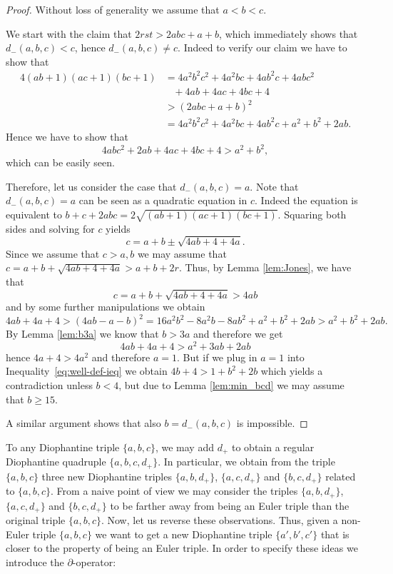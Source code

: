 \documentclass{amsart}
\theoremstyle{definition}
\begin{document}
\begin{proof}
 Without loss of generality we assume that $a<b<c$.

 We start with the claim that $2rst>2abc+a+b$, which immediately shows that $d_{-}(a,b,c)<c$, hence $d_{-}(a,b,c)\neq c$. Indeed to verify our claim we have
 to show that
 \begin{align*}
 4(ab+1)(ac+1)(bc+1)&=4a^2b^2c^2+4a^2bc+4ab^2c+4abc^2\\
 &\;\;\;+4ab+4ac+4bc+4\\
 &>\left(2abc+a+b\right)^2\\
 &=4a^2b^2c^2+4a^2bc+4ab^2c+a^2+b^2+2ab.
 \end{align*}
 Hence we have to show that
 $$4abc^2+2ab+4ac+4bc+4>a^2+b^2,$$
 which can be easily seen.
 
 Therefore, let us consider the case that $d_{-}(a,b,c)=a$. Note that $d_{-}(a,b,c)=a$ 
 can be seen as a quadratic equation in $c$. Indeed the equation is equivalent to $b+c+2abc=2\sqrt{(ab+1)(ac+1)(bc+1)}$.
 Squaring both sides and solving for $c$ yields
 $$c=a+b\pm \sqrt{4ab+4+4a}.$$
 Since we assume that $c>a,b$ we may assume that $c=a+b+ \sqrt{4ab+4+4a}>a+b+2r$. Thus, by Lemma \ref{lem:Jones}, we have that
 $$c=a+b+\sqrt{4ab+4+4a}>4ab$$
 and by some further manipulations we obtain
 \begin{equation}\label{eq:well-def-ieq}
 4ab+4a+4>(4ab-a-b)^2=16a^2b^2-8a^2b-8ab^2+a^2+b^2+2ab>a^2+b^2+2ab.
 \end{equation}
By Lemma \ref{lem:b3a} we know that $b>3a$ and therefore we get
 $$4ab+4a+4>a^2+3ab+2ab$$
 hence $4a+4>4a^2$ and therefore $a=1$. But if we plug in $a=1$ into Inequality~\eqref{eq:well-def-ieq}
 we obtain $4b+4>1+b^2+2b$ which yields a contradiction unless $b<4$, but due to Lemma \ref{lem:min_bcd} we may assume that $b\geq 15$.
 
 A similar argument shows that also $b=d_{-}(a,b,c)$ is impossible.
\end{proof}

To any Diophantine triple $\{a,b,c\}$, we may add $d_{+}$ to obtain a regular Diophantine quadruple $\{a,b,c,d_{+}\}$. In particular,
we obtain from the triple $\{a,b,c\}$ three new Diophantine triples $\{a,b,d_{+}\}$, $\{a,c,d_{+}\}$ and $\{b,c,d_{+}\}$ related to  $\{a,b,c\}$.
From a naive point of view we may consider the triples $\{a,b,d_{+}\}$, $\{a,c,d_{+}\}$ and $\{b,c,d_{+}\}$ to be farther away from being
an Euler triple than the original triple $\{a,b,c\}$. Now, let us reverse these observations. Thus, given a non-Euler triple $\{a,b,c\}$ 
we want to get a new Diophantine triple $\{a',b',c'\}$ that is closer to the property of being an Euler triple. In order to specify these ideas
we introduce the $\partial$-operator:
\end{document}
